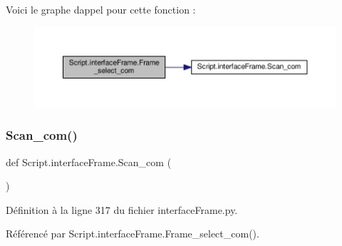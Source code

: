 Voici le graphe d\textquotesingle{}appel pour cette fonction \+:\nopagebreak
\begin{figure}[H]
\begin{center}
\leavevmode
\includegraphics[width=350pt]{namespaceScript_1_1interfaceFrame_a3538cb8357b74776a380240ed3221bc0_cgraph}
\end{center}
\end{figure}
\mbox{\label{namespaceScript_1_1interfaceFrame_a76119121c3aceb43846ba3ea526623ad}} 
\subsubsection{\texorpdfstring{Scan\+\_\+com()}{Scan\_com()}}
{\footnotesize\ttfamily def Script.\+interface\+Frame.\+Scan\+\_\+com (\begin{DoxyParamCaption}{ }\end{DoxyParamCaption})}



Définition à la ligne 317 du fichier interface\+Frame.\+py.



Référencé par Script.\+interface\+Frame.\+Frame\+\_\+select\+\_\+com().


